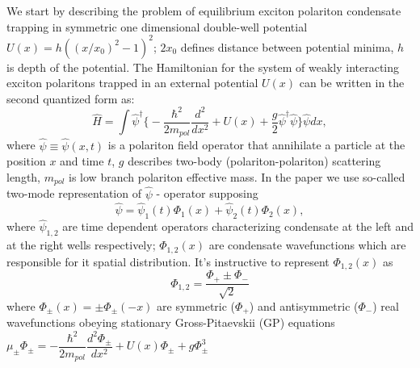 \documentclass[aps, pre, preprint, groupedaddress, superscriptaddress, showkeys, showpacs] {revtex4-1}
\begin{document}
We start by describing the problem of equilibrium exciton polariton condensate trapping in symmetric one dimensional double-well potential $U(x) = h ((x/x_0)^2 - 1)^2$; $2x_0$ defines distance between potential minima, $h$ is depth of the potential.
% 
%
The Hamiltonian for the system of weakly interacting exciton polaritons trapped in an external potential $U(x)$ can be written in the second quantized form as:
%
\begin{equation}
\hat{H} = \int \hat{\psi}^\dag\Big\{ -\dfrac{\hbar^2}{2m_{pol}}  \dfrac{d^2 }{dx^2} + U(x) + \dfrac{g}{2} \hat{\psi}^{\dag} \hat{\psi}  \Big\}\hat{\psi} dx,
\label{eq:gpe_hamiltonian}
\end{equation}
%
where $\hat{\psi} \equiv \hat{\psi}(x, t)$ is a polariton field operator that annihilate a particle at the position $x$ and time $t$, $g$ describes two-body (polariton-polariton) scattering length, $m_{pol}$ is low branch polariton effective mass.
In the paper we use so-called two-mode representation of $\hat{\psi}$ - operator supposing
%
\begin{equation}
\hat{\psi} = \hat{\psi}_1(t) \Phi_1(x) + \hat{\psi}_2(t) \Phi_2(x),
\label{eq:two_modes}
\end{equation}
%
where $\hat{\psi}_{1,2}$ are time dependent operators characterizing condensate at the left and at the right wells respectively; $\Phi_{1,2}(x)$ are condensate wavefunctions which are responsible for it spatial distribution.
It's instructive to represent  $\Phi_{1,2}(x)$ as
%
\begin{equation}
\Phi_{1,2} = \dfrac{\Phi_+ \pm \Phi_-}{\sqrt{2}}
\label{eq:basic_modes}
\end{equation}
%
where $\Phi_{\pm}(x) = \pm \Phi_{\pm}(-x)$ are symmetric ($\Phi_+$) and antisymmetric ($\Phi_-$) real wavefunctions obeying stationary Gross-Pitaevskii (GP) equations $\mu_{\pm} \Phi_{\pm} = -\dfrac{\hbar^2}{2m_{pol}} \dfrac{d^2 \Phi_{\pm}}{dx^2} + U(x) \Phi_{\pm} + g \Phi_{\pm}^3$
%
\end{document}
